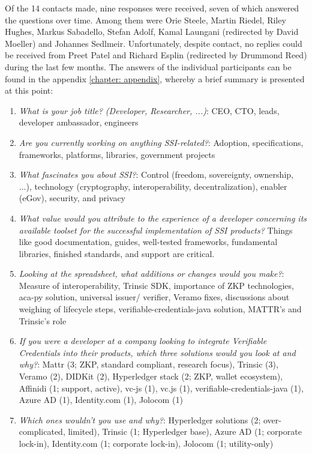 	Of the 14 contacts made, nine responses were received, seven of which answered the questions over time. Among them were Orie Steele, Martin Riedel, Riley Hughes, Markus Sabadello, Stefan Adolf, Kamal Laungani (redirected by David Moeller) and Johannes Sedlmeir. Unfortunately, despite contact, no replies could be received from Preet Patel and Richard Esplin (redirected by Drummond Reed) during the last few months. The answers of the individual participants can be found in the appendix \ref{chapter: appendix}, whereby a brief summary is presented at this point:
	
    \begin{enumerate}
        \item \textit{What is your job title? (Developer, Researcher, ...)}: CEO, CTO, leads, developer ambassador, engineers
        \item \textit{Are you currently working on anything SSI-related?}: Adoption, specifications, frameworks, platforms, libraries, government projects   
        \item \textit{What fascinates you about SSI?}: Control (freedom, sovereignty, ownership, ...), technology (cryptography, interoperability, decentralization), enabler (eGov), security, and privacy
        \item \textit{What value would you attribute to the experience of a developer concerning its available toolset for the successful implementation of SSI products?} Things like good documentation, guides, well-tested frameworks, fundamental libraries, finished standards, and support are critical.	
        \item \textit{Looking at the spreadsheet, what additions or changes would you make?}: Measure of interoperability, Trinsic SDK, importance of \ac{ZKP} technologies, aca-py solution, universal issuer/ verifier, Veramo fixes, discussions about weighing of lifecycle steps, verifiable-credentials-java solution, MATTR's and Trinsic's role
        \item \textit{If you were a developer at a company looking to integrate Verifiable Credentials into their products, which three solutions would you look at and why?}:	Mattr (3; ZKP, standard compliant, research focus), Trinsic (3), Veramo (2), DIDKit (2), Hyperledger stack (2; ZKP, wallet ecosystem), Affinidi (1; support, active), vc-js (1), vc.js (1), verifiable-credentials-java (1), Azure AD (1), Identity.com (1), Jolocom (1)	
        \item \textit{Which ones wouldn't you use and why?}: Hyperledger solutions (2; over-complicated, limited), Trinsic (1; Hyperledger base), Azure AD (1; corporate lock-in), Identity.com (1; corporate lock-in), Jolocom (1; utility-only)

\end{enumerate}
